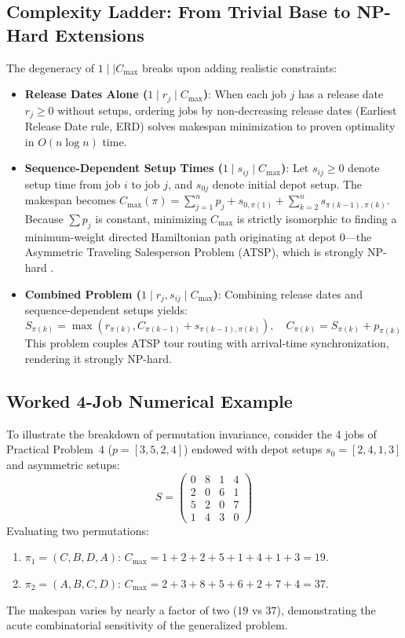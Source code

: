 \documentclass[journal]{IEEEtran}
\begin{document}
\subsection{Complexity Ladder: From Trivial Base to NP-Hard Extensions}
The degeneracy of $1 \mid\mid C_{\max}$ breaks upon adding realistic constraints:
\begin{itemize}
    \item \textbf{Release Dates Alone ($1 \mid r_j \mid C_{\max}$)}: When each job $j$ has a release date $r_j \ge 0$ without setups, ordering jobs by non-decreasing release dates (Earliest Release Date rule, ERD) solves makespan minimization to proven optimality in $O(n \log n)$ time.
    \item \textbf{Sequence-Dependent Setup Times ($1 \mid s_{ij} \mid C_{\max}$)}: Let $s_{ij} \ge 0$ denote setup time from job $i$ to job $j$, and $s_{0j}$ denote initial depot setup. The makespan becomes $C_{\max}(\pi) = \sum_{j=1}^n p_j + s_{0, \pi(1)} + \sum_{k=2}^n s_{\pi(k-1), \pi(k)}$. Because $\sum p_j$ is constant, minimizing $C_{\max}$ is strictly isomorphic to finding a minimum-weight directed Hamiltonian path originating at depot 0—the Asymmetric Traveling Salesperson Problem (ATSP), which is strongly NP-hard \cite{garey1979computers}.
    \item \textbf{Combined Problem ($1 \mid r_j, s_{ij} \mid C_{\max}$)}: Combining release dates and sequence-dependent setups yields:
    \begin{equation}
        S_{\pi(k)} = \max\left(r_{\pi(k)}, C_{\pi(k-1)} + s_{\pi(k-1), \pi(k)}\right), \quad C_{\pi(k)} = S_{\pi(k)} + p_{\pi(k)}
    \end{equation}
    This problem couples ATSP tour routing with arrival-time synchronization, rendering it strongly NP-hard.
\end{itemize}

\subsection{Worked 4-Job Numerical Example}
To illustrate the breakdown of permutation invariance, consider the 4 jobs of Practical Problem~4 ($p=[3, 5, 2, 4]$) endowed with depot setups $s_0 = [2, 4, 1, 3]$ and asymmetric setups:
\begin{equation}
    S = \begin{pmatrix} 0 & 8 & 1 & 4 \\ 2 & 0 & 6 & 1 \\ 5 & 2 & 0 & 7 \\ 1 & 4 & 3 & 0 \end{pmatrix}
\end{equation}
Evaluating two permutations:
\begin{enumerate}
    \item $\pi_1 = (C, B, D, A)$: $C_{\max} = 1 + 2 + 2 + 5 + 1 + 4 + 1 + 3 = 19$.
    \item $\pi_2 = (A, B, C, D)$: $C_{\max} = 2 + 3 + 8 + 5 + 6 + 2 + 7 + 4 = 37$.
\end{enumerate}
The makespan varies by nearly a factor of two ($19$ vs $37$), demonstrating the acute combinatorial sensitivity of the generalized problem.
\end{document}
